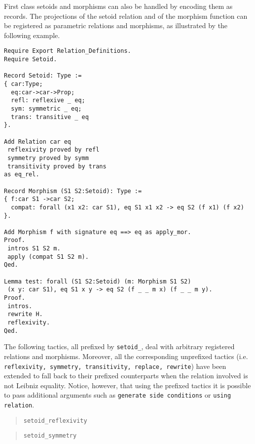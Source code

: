 First class setoids and morphisms can also be handled by encoding them
as records. The projections of the setoid relation and of the morphism
function can be registered as parametric relations and morphisms, as
illustrated by the following example.
\begin{cscexample}
\begin{verbatim}
Require Export Relation_Definitions.
Require Setoid.

Record Setoid: Type :=
{ car:Type;
  eq:car->car->Prop;
  refl: reflexive _ eq;
  sym: symmetric _ eq;
  trans: transitive _ eq
}.

Add Relation car eq
 reflexivity proved by refl
 symmetry proved by symm
 transitivity proved by trans
as eq_rel.

Record Morphism (S1 S2:Setoid): Type :=
{ f:car S1 ->car S2;
  compat: forall (x1 x2: car S1), eq S1 x1 x2 -> eq S2 (f x1) (f x2)
}.

Add Morphism f with signature eq ==> eq as apply_mor.
Proof.
 intros S1 S2 m.
 apply (compat S1 S2 m).
Qed.

Lemma test: forall (S1 S2:Setoid) (m: Morphism S1 S2)
 (x y: car S1), eq S1 x y -> eq S2 (f _ _ m x) (f _ _ m y).
Proof.
 intros.
 rewrite H.
 reflexivity.
Qed.
\end{verbatim}
\end{cscexample}

\label{setoidtactics}
The following tactics, all prefixed by \texttt{setoid\_}, 
deal with arbitrary
registered relations and morphisms. Moreover, all the corresponding unprefixed
tactics (i.e. \texttt{reflexivity, symmetry, transitivity, replace, rewrite})
have been extended to fall back to their prefixed counterparts when
the relation involved is not Leibniz equality. Notice, however, that using
the prefixed tactics it is possible to pass additional arguments such as
\texttt{generate side conditions} or \texttt{using relation}.

\begin{verse}
  \texttt{setoid\_reflexivity}
\end{verse}

\begin{verse}
  \texttt{setoid\_symmetry}
  \\
\end{verse}

